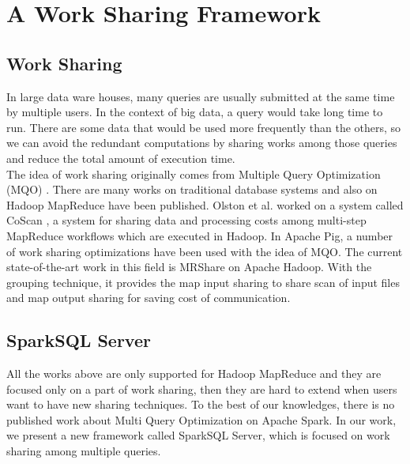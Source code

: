 
\chapter{A Work Sharing Framework} %

\label{Chapter3} %



\section{Work Sharing}

In large data ware houses, many queries are usually submitted at the same time by multiple users. In the context of big data, a query would take long time to run. There are some data that would be used more frequently than the others, so we can avoid the redundant computations by sharing works among those queries and reduce the total amount of execution time. \\
The idea of work sharing originally comes from Multiple Query Optimization (MQO) \cite{sellis1988}. There are many works on traditional database systems \cite{cosar1993} \cite{bayir2007} \cite{georgios2012} \cite{stavros2005} and also on Hadoop MapReduce have been published. Olston et al. worked on a system called CoScan \cite{olston2011}, a system for sharing data and processing costs among multi-step MapReduce workflows which are executed in Hadoop. In Apache Pig, a number of work sharing optimizations \cite{pigmqo} have been used with the idea of MQO. The current state-of-the-art work in this field is MRShare\cite{nikiel2010} on Apache Hadoop. With the grouping technique, it provides the map input sharing to share scan of input files and map output sharing for saving cost of communication.\\

\section{SparkSQL Server}
All the works above are only supported for Hadoop MapReduce and they are focused only on a part of work sharing, then they are hard to extend when users want to have new sharing techniques. To the best of our knowledges, there is no published work about Multi Query Optimization on Apache Spark. In our work, we present a new framework called SparkSQL Server, which is focused on work sharing among multiple queries.\\


